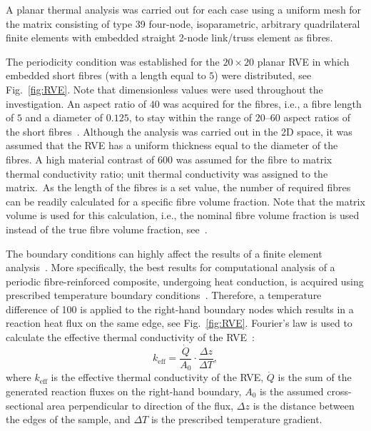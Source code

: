 A planar thermal analysis was carried out for each case using a uniform mesh for the matrix consisting of type 39 four-node, isoparametric, arbitrary quadrilateral finite elements with embedded straight 2-node link/truss element as fibres.


The periodicity condition was established for the $20\times20$ planar RVE in which embedded short fibres (with a length equal to $5$) were distributed, see Fig.~\ref{fig:RVE}. Note that dimensionless values were used throughout the investigation. An aspect ratio of $40$ was acquired for the fibres, i.e., a fibre length of $5$ and a diameter of $0.125$, to stay within the range of $20$\thinspace--\thinspace$60$ aspect ratios of the short fibres~\autocite{Kalpakjian.2010}. Although the analysis was carried out in the 2D space, it was assumed that the RVE has a uniform thickness equal to the diameter of the fibres. A high material contrast of $600$ was assumed for the fibre to matrix thermal conductivity ratio; unit thermal conductivity was assigned to the matrix.\red\ As the length of the fibres is a set value, the number of required fibres can be readily calculated for a specific fibre volume fraction. Note that the matrix volume is used for this calculation, i.e., the nominal fibre volume fraction is used instead of the true fibre volume fraction, see~\autocite{Javanbakht.2016b}.\bl

The boundary conditions can highly affect the results of a finite element analysis~\autocite{Javanbakht.2017b}. More specifically, the best results for computational analysis of a periodic fibre-reinforced composite, undergoing heat conduction, is acquired using prescribed temperature boundary conditions~\autocite{Islam.1999}. Therefore, a temperature difference of 100 is applied to the right-hand boundary nodes which results in a reaction heat flux on the same edge, see Fig.~\ref{fig:RVE}. Fourier's law is used to calculate the effective thermal conductivity of the RVE~\autocite{Fiedler.2009}:
\begin{equation}
k_{\text{eff}}=\frac{\dot{Q}}{A_0}\cdot\frac{\Delta z}{\Delta T},
\end{equation}%
where $k_{\text{eff}}$ is the effective thermal conductivity of the RVE, $\dot{Q}$ is the sum of the generated reaction fluxes on the right-hand boundary, $A_0$ is the assumed cross-sectional area perpendicular to direction of the flux, $\Delta z$ is the distance between the edges of the sample, and $\Delta T$ is the prescribed temperature gradient.  

